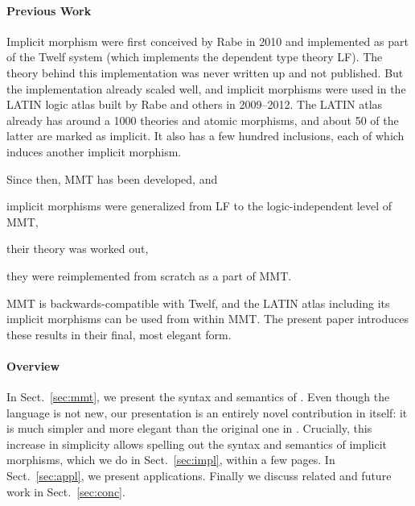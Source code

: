 \paragraph{Previous Work}
Implicit morphism were first conceived by Rabe in 2010 and implemented as part of the Twelf system \cite{twelf} (which implements the dependent type theory LF).
The theory behind this implementation was never written up and not published.
But the implementation already scaled well, and implicit morphisms were used in the LATIN logic atlas \cite{CHKMR:latinabs:11} built by Rabe and others in 2009--2012.
The LATIN atlas already has around a 1000 theories and atomic morphisms, and about 50 of the latter are marked as implicit.
It also has a few hundred inclusions, each of which induces another implicit morphism.

Since then, MMT has been developed, and
\begin{compactitem}
 \item implicit morphisms were generalized from LF to the logic-independent level of MMT,
 \item their theory was worked out,
 \item they were reimplemented from scratch as a part of MMT.
\end{compactitem}
MMT is backwards-compatible with Twelf, and the LATIN atlas including its implicit morphisms can be used from within MMT.
The present paper introduces these results in their final, most elegant form.

\paragraph{Overview}
In Sect.~\ref{sec:mmt}, we present the syntax and semantics of \mmt.
Even though the \mmt language is not new, our presentation is an entirely novel contribution in itself: it is much simpler and more elegant than the original one in \cite{RK:mmt:10}.
%
Crucially, this increase in simplicity allows spelling out the syntax and semantics of implicit morphisms, which we do in Sect.~\ref{sec:impl}, within a few pages.
In Sect.~\ref{sec:appl}, we present applications.
Finally we discuss related and future work in Sect.~\ref{sec:conc}.

